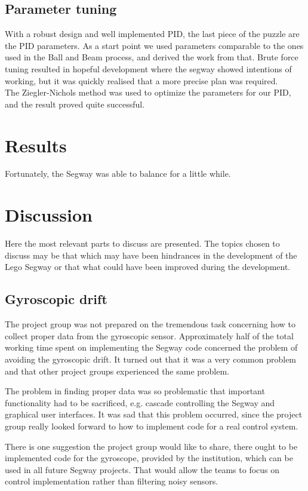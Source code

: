 \subsection{Parameter tuning}
With a robust design and well implemented PID, the last piece of the puzzle are the PID parameters. As a start point we used parameters comparable to the ones used in the Ball and Beam process, and derived the work from that. Brute force tuning resulted in hopeful development where the segway showed intentions of working, but it was quickly realised that a more precise plan was required.
\\[3ex]
The Ziegler-Nichols method \cite{ziegler} was used to optimize the parameters for our PID, and the result proved quite successful. 

\section{Results}
Fortunately, the Segway was able to balance for a little while.

\section{Discussion}
Here the most relevant parts to discuss are presented. The topics chosen to discuss may be that which may have been hindrances in the development of the Lego Segway or that what could have been improved during the development. 

\subsection{Gyroscopic drift}
The project group was not prepared on the tremendous task concerning how to collect proper data from the gyroscopic sensor. Approximately half of the total working time spent on implementing the Segway code concerned the problem of avoiding the gyroscopic drift. 
It turned out that it was a very common problem and that other project groups experienced the same problem. 

\noindent The problem in finding proper data was so problematic that important functionality had to be sacrificed, e.g. cascade controlling the Segway and graphical user interfaces. It was sad that this problem occurred, since the project group really looked forward to how to implement code for a real control system. 

\noindent There is one suggestion the project group would like to share, there ought to be implemented code for the gyroscope, provided by the institution, which can be used in all future Segway projects. That would allow the teams to focus on control implementation rather than filtering noisy sensors.  

